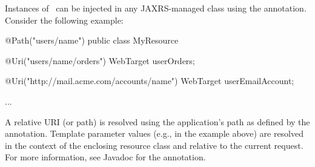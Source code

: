 Instances of \WebTarget\ can be injected in any JAXRS-managed class using the  annotation. Consider the following example:
     
\begin{listing}{1}    
@Path("users/{name}")
public class MyResource {
    @Uri("users/{name}/orders")
    WebTarget userOrders;

    @Uri("http://mail.acme.com/accounts/{name}")
    WebTarget userEmailAccount;

    ...
}
\end{listing}

A relative URI (or path) is resolved using the application's path as defined by the  annotation. Template parameter values 
(e.g.,  in the example above) are resolved in the context of the enclosing resource class and relative to the current request. For more information, see Javadoc for the  annotation.




